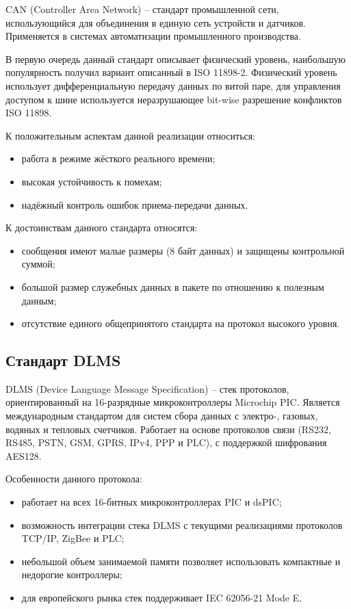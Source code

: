 CAN (Controller Area Network) – стандарт промышленной сети, использующийся для объединения в единую сеть устройств и датчиков. Применяется в системах автоматизации промышленного производства. 

В первую очередь данный стандарт описывает физический уровень, наибольшую популярность получил вариант описанный в ISO 11898-2. Физический уровень использует дифференциальную передачу данных по витой паре, для управления доступом к шине используется неразрушающее bit-wise разрешение конфликтов ISO 11898.

К положительным аспектам данной реализации относиться:

\begin{itemize}
 \item работа в режиме жёсткого реального времени;
 \item высокая устойчивость к помехам;
 \item надёжный контроль ошибок приема-передачи данных.
\end{itemize}

К достоинствам данного стандарта относятся:

\begin{itemize}
 \item сообщения имеют малые размеры (8 байт данных) и защищены контрольной суммой;
 \item большой размер служебных данных в пакете по отношению к полезным данным;
 \item отсутствие единого общепринятого стандарта на протокол высокого уровня.
\end{itemize}

\subsection{Стандарт DLMS}

DLMS (Device Language Message Specification) – стек протоколов, ориентированный на 16-разрядные микроконтроллеры Microchip PIC. Является международным стандартом для систем сбора данных с электро-, газовых, водяных и тепловых счетчиков. Работает на основе протоколов связи (RS232, RS485, PSTN, GSM, GPRS, IPv4, PPP и PLC), с поддержкой шифрования AES128.

Особенности данного протокола:

\begin{itemize}
 \item работает на всех 16-битных микроконтроллерах PIC и dsPIC;
 \item возможность интеграции стека DLMS с текущими реализациями протоколов TCP/IP, ZigBee и PLC;
 \item небольшой объем занимаемой памяти позволяет использовать компактные и недорогие контроллеры;
 \item для европейского рынка стек поддерживает IEC 62056-21 Mode E.
\end{itemize}

